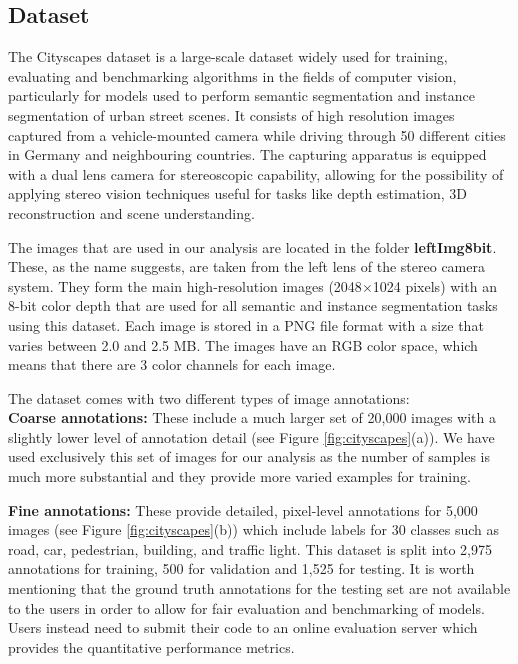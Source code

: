 \subsection{Dataset}

The Cityscapes dataset is a large-scale dataset widely used for training, evaluating and benchmarking algorithms in the fields of computer vision, particularly for models used to perform semantic segmentation and instance segmentation of urban street scenes. It consists of high resolution images captured from a vehicle-mounted camera while driving through 50 different cities in Germany and neighbouring countries. The capturing apparatus is equipped with a dual lens camera for stereoscopic capability, allowing for the possibility of applying stereo vision techniques useful for tasks like depth estimation, 3D reconstruction and scene understanding. 

The images that are used in our analysis are located in the folder \textbf{leftImg8bit}. These, as the name suggests, are taken from the left lens of the stereo camera system. They form the main high-resolution images (2048$\times$1024 pixels) with an 8-bit color depth that are used for all semantic and instance segmentation tasks using this dataset. Each image is stored in a PNG file format with a size that varies between 2.0 and 2.5 MB. The images have an RGB color space, which means that there are 3 color channels for each image.

The dataset comes with two different types of image annotations:\\
\textbf{Coarse annotations:} These include a much larger set of 20,000 images with a slightly lower level of annotation detail (see Figure \ref{fig:cityscapes}(a)). We have used exclusively this set of images for our analysis as the number of samples is much more substantial and they provide more varied examples for training. 

\textbf{Fine annotations:} These provide detailed, pixel-level annotations for 5,000 images (see Figure \ref{fig:cityscapes}(b)) which include labels for 30 classes such as road, car, pedestrian, building, and traffic light. This dataset is split into 2,975 annotations for training, 500 for validation and 1,525 for testing. It is worth mentioning that the ground truth annotations for the testing set are not available to the users in order to allow for fair evaluation and benchmarking of models. Users instead need to submit their code to an online evaluation server which provides the quantitative performance metrics. 

